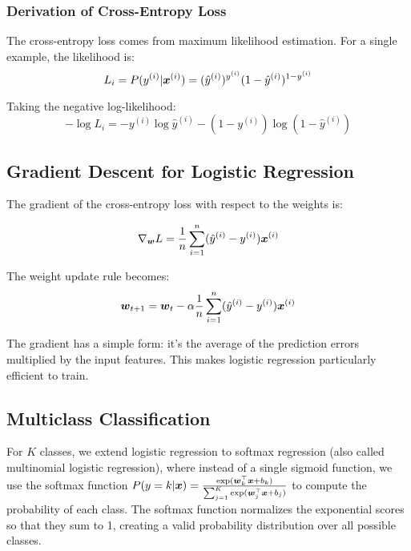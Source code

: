 \subsubsection{Derivation of Cross-Entropy Loss}

The cross-entropy loss comes from maximum likelihood estimation. For a single example, the likelihood is:
$$L_i = P(y^{(i)}|\boldsymbol{x}^{(i)}) = (\hat{y}^{(i)})^{y^{(i)}} (1-\hat{y}^{(i)})^{1-y^{(i)}}$$

Taking the negative log-likelihood:
$$-\log L_i = -y^{(i)} \log \hat{y}^{(i)} - (1-y^{(i)}) \log(1-\hat{y}^{(i)})$$

\subsection{Gradient Descent for Logistic Regression}

The gradient of the cross-entropy loss with respect to the weights is:

\begin{equation}
\nabla_{\boldsymbol{w}} L = \frac{1}{n} \sum_{i=1}^{n} (\hat{y}^{(i)} - y^{(i)}) \boldsymbol{x}^{(i)}
\end{equation}

The weight update rule becomes:
\begin{equation}
\boldsymbol{w}_{t+1} = \boldsymbol{w}_t - \alpha \frac{1}{n} \sum_{i=1}^{n} (\hat{y}^{(i)} - y^{(i)}) \boldsymbol{x}^{(i)}
\end{equation}

\begin{remark}
The gradient has a simple form: it's the average of the prediction errors multiplied by the input features. This makes logistic regression particularly efficient to train.
\end{remark}

\subsection{Multiclass Classification}

For $K$ classes, we extend logistic regression to softmax regression (also called multinomial logistic regression), where instead of a single sigmoid function, we use the softmax function $P(y=k|\boldsymbol{x}) = \frac{\exp(\boldsymbol{w}_k^\top \boldsymbol{x} + b_k)}{\sum_{j=1}^{K} \exp(\boldsymbol{w}_j^\top \boldsymbol{x} + b_j)}$ to compute the probability of each class. The softmax function normalizes the exponential scores so that they sum to 1, creating a valid probability distribution over all possible classes.


